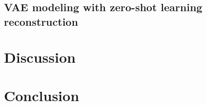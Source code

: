 \documentclass[journal,twoside,web]{ieeecolor}
\begin{document}
	\subsection{VAE modeling with zero-shot learning reconstruction}


	\section{Discussion}


	\section{Conclusion}




	
	
\end{document}
